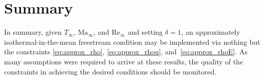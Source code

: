 \documentclass[letterpaper,11pt,nointlimits,reqno]{amsart}
\newcommand{\Mach}[1][]{\mbox{Ma}_{#1}}
\newcommand{\Reynolds}[1][]{\mbox{Re}_{#1}}
\begin{document}
\section{Summary}

In summary, given $T_\infty$, $\Mach[\infty]{}$, and $\Reynolds[\infty]{}$ and
setting $\delta=1$, an approximately isothermal-in-the-mean freestream
condition may be implemented via nothing but the constraints
\eqref{eq:approx_rho}, \eqref{eq:approx_rhou}, and~\eqref{eq:approx_rhoE}.  As
many assumptions were required to arrive at these results, the quality of the
constraints in achieving the desired conditions should be monitored.
\end{document}
